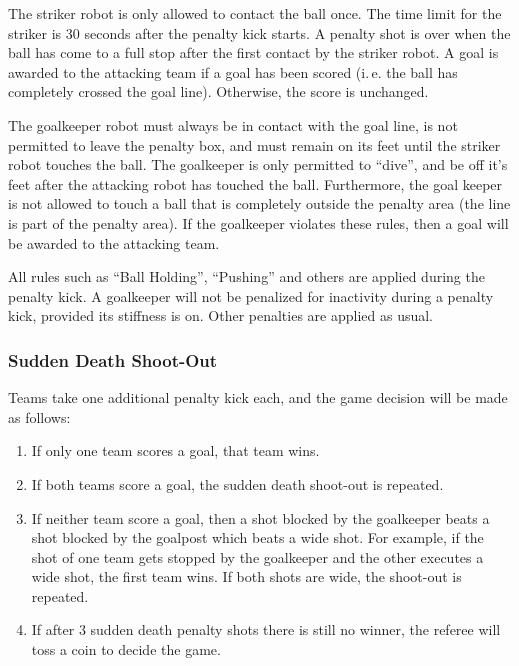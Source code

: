 \documentclass[12pt]{article}
\newcommand{\ie}{\mbox{i.\,e.}\xspace}
\newcommand{\PenaltyKickTime}{30 seconds\xspace}
\begin{document}
The striker robot is only allowed to contact the ball once.
The time limit for the striker is \PenaltyKickTime after the penalty kick starts.
A penalty shot is over when the ball has come to a full stop after the first contact by the striker robot.
A goal is awarded to the attacking team if a goal has been scored (\ie the ball has completely crossed the goal line).
Otherwise, the score is unchanged.

The goalkeeper robot must always be in contact with the goal line, is not permitted to leave the penalty box, and must remain on its feet until the striker robot touches the ball. 
The goalkeeper is only permitted to ``dive'', and be off it's feet after the attacking robot has touched the ball.
Furthermore, the goal keeper is not allowed to touch a ball that is completely outside the penalty area (the line is part of the penalty area).
If the goalkeeper violates these rules, then a goal will be awarded to the attacking team.

All rules such as ``Ball Holding'', ``Pushing'' and others are applied during the penalty kick. 
A goalkeeper will not be penalized for inactivity during a penalty kick, provided its stiffness is on. 
Other penalties are applied as usual.

\subsubsection{Sudden Death Shoot-Out}
\label{sec:sudden_death_shoot_out}

Teams take one additional penalty kick each, and the game decision will be made as follows:
\begin{enumerate}
  \item If only one team scores a goal, that team wins.
  \item If both teams score a goal, the sudden death shoot-out is repeated.
  \item If neither team score a goal, then a shot blocked by the goalkeeper beats a shot blocked by the goalpost which beats a wide shot. For example, if the shot of one team gets stopped by the goalkeeper and the other executes a wide shot, the first team wins. If both shots are wide, the shoot-out is repeated.
  \item If after 3 sudden death penalty shots there is still no winner, the referee will toss a coin to decide the game.
\end{enumerate}
\end{document}
